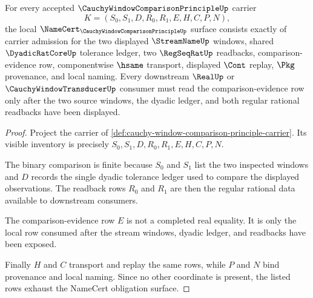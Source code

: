 \begin{theorem}
\label{thm:cauchy-window-comparison-principle-namecert-obligations}
For every accepted $\CauchyWindowComparisonPrincipleUp$ carrier
$$
K=(S_0,S_1,D,R_0,R_1,E,H,C,P,N),
$$
the local $\NameCert_{\CauchyWindowComparisonPrincipleUp}$ surface consists exactly of carrier admission for the two displayed $\StreamNameUp$ windows, shared $\DyadicRatCoreUp$ tolerance ledger, two $\RegSeqRatUp$ readbacks, comparison-evidence row, componentwise $\hsame$ transport, displayed $\Cont$ replay, $\Pkg$ provenance, and local naming. Every downstream $\RealUp$ or $\CauchyWindowTransducerUp$ consumer must read the comparison-evidence row only after the two source windows, the dyadic ledger, and both regular rational readbacks have been displayed.
\end{theorem}
\begin{proof}
Project the carrier of \autoref{def:cauchy-window-comparison-principle-carrier}. Its visible inventory is precisely $S_0,S_1,D,R_0,R_1,E,H,C,P,N$.

The binary comparison is finite because $S_0$ and $S_1$ list the two inspected windows and $D$ records the single dyadic tolerance ledger used to compare the displayed observations. The readback rows $R_0$ and $R_1$ are then the regular rational data available to downstream consumers.

The comparison-evidence row $E$ is not a completed real equality. It is only the local row consumed after the stream windows, dyadic ledger, and readbacks have been exposed.

Finally $H$ and $C$ transport and replay the same rows, while $P$ and $N$ bind provenance and local naming. Since no other coordinate is present, the listed rows exhaust the NameCert obligation surface.
\end{proof}

